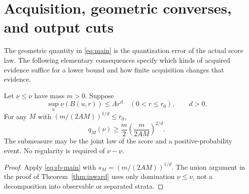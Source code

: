 \section{Acquisition, geometric converses, and output cuts}\label{sec:geometry}
The geometric quantity in \eqref{eq:main} is the quantization error of the actual score law. The following elementary consequences specify which kinds of acquired evidence suffice for a lower bound and how finite acquisition changes that evidence.

\begin{proposition}\label{prop:submass}
Let $\underline\nu\le\nu$ have mass $m>0$. Suppose
\[
 \sup_u\underline\nu(B(u,r))\le A r^d
 \quad (0<r\le r_0),\qquad d>0.
\]
For any $M$ with $(m/(2AM))^{1/d}\le r_0$,
\[
 q_M(\nu)\ge \frac m2\left(\frac{m}{2AM}\right)^{2/d}.
\]
The submeasure may be the joint law of the score and a positive-probability event. No regularity is required of $\nu-\underline\nu$.
\end{proposition}
\begin{proof}
Apply \eqref{eq:sb-main} with $s_M=(m/(2AM))^{1/d}$. The union argument in the proof of Theorem~\ref{thm:inward} uses only domination $\underline\nu\le\nu$, not a decomposition into observable or separated strata.
\end{proof}

